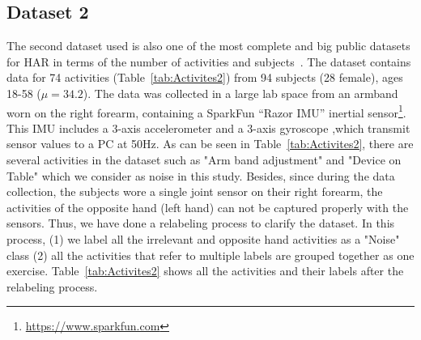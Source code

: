 \subsection{Dataset 2} \label{sec:dataset2}
The second dataset used is also one of the most complete and big public datasets for HAR in terms of the number of activities and subjects~\cite{morris2014recofit}. The dataset contains data for 74 activities (Table~\ref{tab:Activites2}) from 94 subjects (28 female), ages 18-58 ($\mu=34.2$). The data was collected in a large lab space from an armband worn on the right forearm, containing a SparkFun “Razor IMU” inertial sensor\footnote{\url{https://www.sparkfun.com}}. This IMU includes a 3-axis accelerometer and a 3-axis gyroscope ,which transmit sensor values to a PC at 50Hz. As can be seen in Table~\ref{tab:Activites2}, there are several activities in the dataset such as "Arm band adjustment" and "Device on Table" which we consider as noise in this study. Besides, since during the data collection, the subjects wore a single joint sensor on their right forearm, the activities of the opposite hand (left hand) can not be captured properly with the sensors. Thus, we have done a relabeling process to clarify the dataset. In this process, (1) we label all the irrelevant and opposite hand activities as a "Noise" class (2) all the activities that refer to multiple labels are grouped together as one exercise. Table~\ref{tab:Activites2} shows all the activities and their labels after the relabeling process.   


